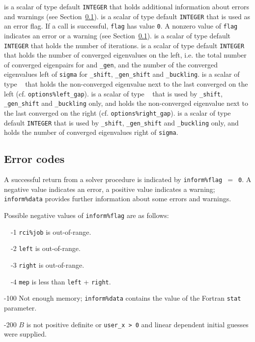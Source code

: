 \begin{description}
%
is a scalar of type default {\tt INTEGER} that holds 
additional information about errors and warnings
(see Section~\ref{sec:err}).
%
 is a scalar of type default {\tt INTEGER} 
that is used as an error flag.
If a call is successful, {\tt flag} has value {\tt 0}.
A nonzero value of {\tt flag} indicates an error or a warning
(see Section~\ref{sec:err}).
%
 is a scalar of type default {\tt INTEGER} that holds 
the number of iterations.
%
is a scalar of type default {\tt INTEGER} that holds
the number of converged eigenvalues on the left,
i.e. the total number of converged eigenpairs for 
{\tt \solver} and {\tt \solver\_gen},
and the number of the converged eigenvalues left of {\tt sigma}
for {\tt \solver\_shift}, {\tt \solver\_gen\_shift}
and {\tt \solver\_buckling}.
%
is a scalar of type \REALDP\ %
that holds
the non-converged eigenvalue next to the last converged on the left
(cf. {\tt options\%left\_gap}).
%
is a scalar of type \REALDP\ %
that is used by
{\tt \solver\_shift}, {\tt \solver\_gen\_shift}
and {\tt \solver\_buckling}
only, and holds
the non-converged eigenvalue next to the last converged on the right
(cf. {\tt options\%right\_gap}).
%
is a scalar of type default {\tt INTEGER} that 
is used by 
{\tt \solver\_shift}, {\tt \solver\_gen\_shift}
and {\tt \solver\_buckling}
only, and holds
the number of converged eigenvalues right of {\tt sigma}.
%
\end{description}

\subsection{Error codes}

\label{sec:err}

A successful return from 
a solver procedure
is indicated 
by {\tt inform\%flag $=$ 0}.
A negative value indicates an error, a positive value indicates a warning;
{\tt inform\%data} provides further information
about some errors and warnings. 

\noindent
Possible negative values of {\tt inform\%flag}
are as follows:
%
\begin{description}
%
\item{~~-1}
\hskip 9pt
{\tt rci\%job}  is out-of-range.
%
\item{~~-2}
\hskip 7pt
{\tt left} is out-of-range.
%
\item{~~-3}
\hskip 7pt
{\tt right} is out-of-range.
%
\item{~~-4}
\hskip 7pt
{\tt mep} is less than {\tt left} + {\tt right}.
%
\item{-100}
\hskip 4pt
Not enough memory;
{\tt inform\%data} contains the value of the Fortran {\tt stat} parameter.
%
\item{-200}
\hskip 4pt
$B$ is not positive definite or {\tt user\_x > 0} and
linear dependent initial guesses were supplied.
%
\end{description}

